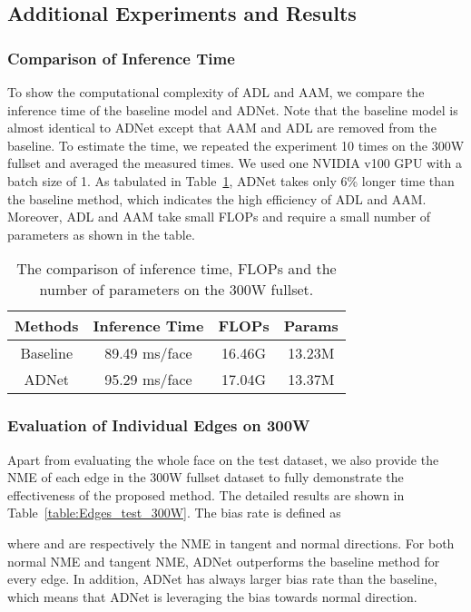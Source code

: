 \documentclass[10pt,twocolumn,letterpaper]{article}
\begin{document}
\subsection{Additional Experiments and Results}

\subsubsection{Comparison of Inference Time}
To show the computational complexity of ADL and AAM, we compare the inference time of the baseline model and ADNet. Note that the baseline model is almost identical to ADNet except that AAM and ADL are removed from the baseline.
To estimate the time, we repeated the experiment 10 times on the 300W fullset and averaged the measured times. 
We used one NVIDIA v100 GPU with a batch size of 1.
As tabulated in Table~\ref{table:exp_time_cost}, ADNet takes only 6\% longer time than the baseline method, which indicates the high efficiency of ADL and AAM.
Moreover, ADL and AAM take small FLOPs and require a small number of parameters as shown in the table.

\begin{table}[htbp]
\centering
\begin{tabular}{|c|c|c|c|}
\hline
Methods & Inference Time & FLOPs & Params \\
\hline
Baseline & 89.49 ms/face & 16.46G & 13.23M \\
ADNet & 95.29 ms/face & 17.04G & 13.37M \\
\hline
\end{tabular}
\vspace{1mm}
\caption{The comparison of inference time, FLOPs and the number of parameters on the 300W fullset.}
\label{table:exp_time_cost}
\end{table}


\subsubsection{Evaluation of Individual Edges on 300W}
Apart from evaluating the whole face on the test dataset, we also provide the NME of each edge in the 300W fullset dataset to fully demonstrate the effectiveness of the proposed method. 
The detailed results are shown in Table~\ref{table:Edges_test_300W}. The bias rate is defined as

where  and  are respectively the NME in tangent and normal directions. 
For both normal NME and tangent NME, ADNet outperforms the baseline method for every edge. In addition, ADNet has always larger bias rate than the baseline, which means that ADNet is leveraging the bias towards normal direction.
\end{document}
